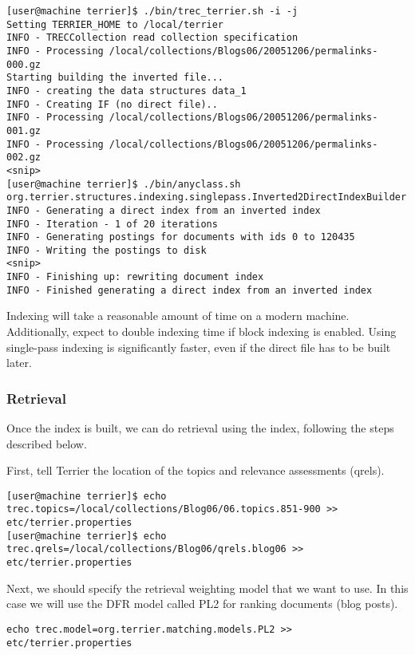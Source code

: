 \begin{verbatim}
[user@machine terrier]$ ./bin/trec_terrier.sh -i -j
Setting TERRIER_HOME to /local/terrier
INFO - TRECCollection read collection specification
INFO - Processing /local/collections/Blogs06/20051206/permalinks-000.gz
Starting building the inverted file...
INFO - creating the data structures data_1
INFO - Creating IF (no direct file)..
INFO - Processing /local/collections/Blogs06/20051206/permalinks-001.gz
INFO - Processing /local/collections/Blogs06/20051206/permalinks-002.gz
<snip>
[user@machine terrier]$ ./bin/anyclass.sh org.terrier.structures.indexing.singlepass.Inverted2DirectIndexBuilder
INFO - Generating a direct index from an inverted index
INFO - Iteration - 1 of 20 iterations
INFO - Generating postings for documents with ids 0 to 120435
INFO - Writing the postings to disk
<snip>
INFO - Finishing up: rewriting document index
INFO - Finished generating a direct index from an inverted index
\end{verbatim}

Indexing will take a reasonable amount of time on a modern machine.
Additionally, expect to double indexing time if block indexing is
enabled. Using single-pass indexing is significantly faster, even if the
direct file has to be built later.

\subsubsection{Retrieval}\label{retrieval}

Once the index is built, we can do retrieval using the index, following
the steps described below.

First, tell Terrier the location of the topics and relevance assessments
(qrels).

\begin{verbatim}
[user@machine terrier]$ echo trec.topics=/local/collections/Blog06/06.topics.851-900 >> etc/terrier.properties
[user@machine terrier]$ echo trec.qrels=/local/collections/Blog06/qrels.blog06 >> etc/terrier.properties
\end{verbatim}

Next, we should specify the retrieval weighting model that we want to
use. In this case we will use the DFR model called PL2 for ranking
documents (blog posts).

\begin{verbatim}
echo trec.model=org.terrier.matching.models.PL2 >> etc/terrier.properties
\end{verbatim}

